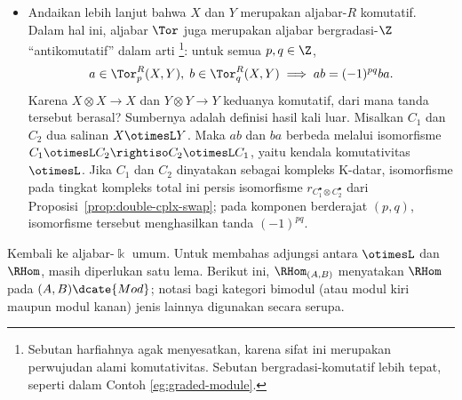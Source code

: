\begin{contoh}
\begin{itemize}
		nonnegatif, dan komponen derajat $0$-nya memberikan subaljabar
		$\Tor^R_0(X, Y) = X \otimes Y$, yang definisinya dapat dilihat dalam
		\cite[Definisi 7.3.1]{Li1}. Hukum asosiatif yang diperlukan bagi
		perkalian dapat diverifikasi dengan mereduksinya kepada kendala
		asosiativitas $\otimesL$ dan hukum asosiatif perkalian masing-masing
		pada $X$ dan $Y$.
		\item Andaikan lebih lanjut bahwa $X$ dan $Y$ merupakan aljabar-$R$
		komutatif. Dalam hal ini, aljabar $\Tor$ juga merupakan aljabar
		bergradasi-$\Z$ ``antikomutatif'' dalam arti
		\cite[Definisi 7.4.3]{Li1}\footnote{Sebutan harfiahnya agak menyesatkan,
		karena sifat ini merupakan perwujudan alami komutativitas. Sebutan
		bergradasi-komutatif lebih tepat, seperti dalam Contoh
		\ref{eg:graded-module}.}: untuk semua $p,q\in\Z$,
		\[ a \in \Tor^R_p(X, Y), \; b \in \Tor^R_q(X, Y) \implies ab = (-1)^{pq} ba. \]
		Karena $X\otimes X\to X$ dan $Y\otimes Y\to Y$ keduanya komutatif,
		dari mana tanda tersebut berasal? Sumbernya adalah definisi hasil kali
		luar. Misalkan $C_1$ dan $C_2$ dua salinan $X\otimesL Y$. Maka $ab$
		dan $ba$ berbeda melalui isomorfisme
		$C_1\otimesL C_2\rightiso C_2\otimesL C_1$, yaitu kendala
		komutativitas $\otimesL$. Jika $C_1$ dan $C_2$ dinyatakan sebagai
		kompleks K-datar, isomorfisme pada tingkat kompleks total ini persis
		isomorfisme $r_{C_1^\bullet \otimes C_2^\bullet}$ dari
		Proposisi~\ref{prop:double-cplx-swap}; pada komponen berderajat $(p,q)$,
		isomorfisme tersebut menghasilkan tanda $(-1)^{pq}$.
	\end{itemize}
\end{contoh}

Kembali ke aljabar-$\Bbbk$ umum. Untuk membahas adjungsi antara $\otimesL$
dan $\RHom$, masih diperlukan satu lema. Berikut ini, $\RHom_{(A,B)}$
menyatakan $\RHom$ pada $(A,B)\dcate{Mod}$; notasi bagi kategori bimodul
(atau modul kiri maupun modul kanan) jenis lainnya digunakan secara serupa.

